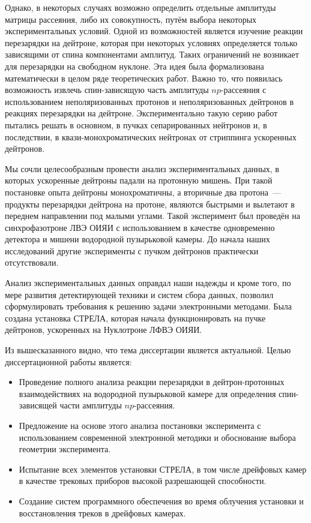 Однако, в некоторых случаях возможно определить отдельные амплитуды матрицы
рассеяния, либо их совокупность, путём выбора некоторых экспериментальных
условий. Одной из возможностей является изучение реакции перезарядки на
дейтроне, которая \! при некоторых условиях определяется только зависящими от
спина компонентами амплитуд. Таких ограничений не возникает для перезарядки на
свободном нуклоне. Эта идея была формализована математически в целом ряде
теоретических работ. Важно то, что появилась возможность извлечь спин-зависящую
часть амплитуды $np$-рассеяния с использованием неполяризованных протонов и
неполяризованных дейтронов в реакциях перезарядки на дейтроне. Экспериментально
такую серию работ пытались решать в основном, в пучках сепарированных нейтронов
и, в последствии, в квази-монохроматических нейтронах от стриппинга ускоренных
дейтронов.

Мы сочли целесообразным провести анализ \! экспериментальных данных, в которых
ускоренные дейтроны падали на протонную мишень. При такой постановке опыта
дейтроны монохроматичны, а вторичные два протона~--- продукты перезарядки
дейтрона на протоне, являются быстрыми и вылетают в переднем направлении под
малыми углами. Такой эксперимент был проведён на синхрофазотроне ЛВЭ ОИЯИ с
использованием в качестве одновременно детектора и мишени водородной пузырьковой
камеры. До начала наших исследований другие эксперименты с пучком дейтронов
практически отсутствовали.

Анализ экспериментальных данных оправдал наши надежды и кроме того, по мере
развития детектирующей техники и систем сбора данных, позволил сформулировать
требования к решению задачи электронными методами. Была создана установка
СТРЕЛА, которая начала функционировать на пучке дейтронов, ускоренных на
Нуклотроне ЛФВЭ ОИЯИ.

Из вышесказанного видно, что тема диссертации является актуальной. Целью
диссертационной работы является:
\begin{itemize}
\item Проведение полного анализа реакции перезарядки в дейтрон-протонных
  взаимодействиях на водородной пузырьковой камере для определения
  спин-зависящей части амплитуды $np$-рассеяния.
\item Предложение на основе этого анализа постановки эксперимента с
  использованием современной электронной методики и обоснование выбора геометрии
  эксперимента.
\item Испытание всех элементов установки СТРЕЛА, в том числе дрейфовых камер в
  качестве трековых приборов высокой разрешающей способности.
\item Создание систем программного обеспечения во время облучения установки и
  восстановления треков в дрейфовых камерах.
\end{itemize}

